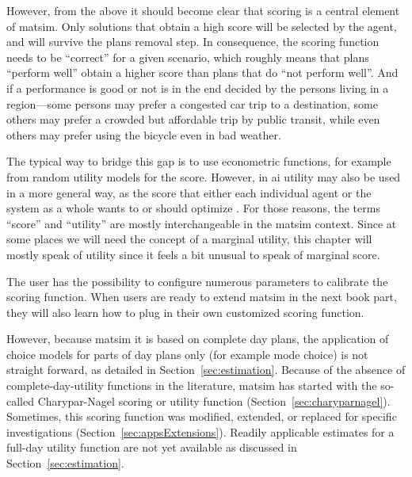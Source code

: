 However, from the above it should become clear that scoring is a central element of \gls{matsim}.  Only solutions that obtain a high score will be selected by the agent, and will survive the plans removal step.  In consequence, the scoring function needs to be ``correct'' for a given scenario, which roughly means that plans ``perform well'' obtain a higher score than plans that do ``not perform well''.  And if a performance is good or not is in the end decided by the persons living in a region---some persons may prefer a congested car trip to a destination, some others may prefer a crowded but affordable trip by public transit, while even others may prefer using the bicycle even in bad weather.

The typical way to bridge this gap is to use econometric  functions, for example from random utility models \citep[e.g.][]{BenAkivaLerman_1985,Train_2003} for the score.  However, in \gls{ai} utility may also be used in a more general way, as the \gls{score} that either each individual agent or the system as a whole wants to or should optimize \citep{RusselNorvig2010ArtificialIntelligence}.  For those reasons, the terms ``\gls{score}'' and ``\gls{utility}'' are mostly interchangeable in the \gls{matsim} context.  Since at some places we will need the concept of a marginal utility, this chapter will mostly speak of utility since it feels a bit unusual to speak of marginal score.

The user has the possibility to configure numerous parameters to calibrate the
scoring function.
When users are ready to extend \gls{matsim} in the next book part, they will also learn how to plug in their own customized scoring function.

However, because \gls{matsim} it is based on complete day plans, the application of choice models for parts of day plans only (for example mode choice) is not straight forward, as detailed in Section~\ref{sec:estimation}.
%
%
Because of the absence of complete-day-utility functions in the literature, \gls{matsim} has
started with the so-called Charypar-Nagel scoring or \gls{utility} function (Section~\ref{sec:charyparnagel}).  Sometimes, this scoring function was modified, extended, or replaced for specific investigations (Section~\ref{sec:appsExtensions}). Readily applicable estimates for a full-day utility function are not yet available as discussed in Section~\ref{sec:estimation}.


